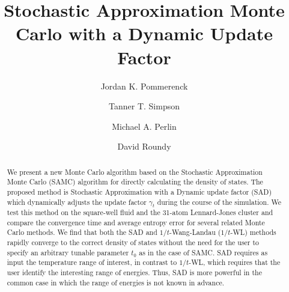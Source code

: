 \documentclass[letterpaper,twocolumn,amsmath,amssymb,pre,aps,10pt]{revtex4-1}
\begin{document}
\title{Stochastic Approximation Monte Carlo with a Dynamic Update
Factor
}

\author{Jordan K. Pommerenck} \author{Tanner T. Simpson}
\author{Michael A. Perlin} \author{David Roundy}

\begin{abstract}
  We present a new Monte Carlo algorithm based on the Stochastic
  Approximation Monte Carlo (SAMC) algorithm for directly calculating
  the density of states. The proposed method is Stochastic
  Approximation with a Dynamic update factor (SAD)
  which dynamically adjusts the update factor $\gamma_t$ during the course of
  the simulation. We test this method on the square-well fluid and
  the 31-atom Lennard-Jones cluster and
  compare the convergence time and average entropy error for several
  related
  Monte Carlo methods. We find that both the SAD and $1/t$-Wang-Landau ($1/t$-WL)
  methods rapidly converge to the
  correct density of states without the need for the user to specify an
  arbitrary tunable parameter $t_0$ as in the case of SAMC.  SAD requires
  as input the temperature range of interest, in contrast to
  $1/t$-WL, which requires that the user identify the interesting range
  of energies.  Thus, SAD is more powerful in the common case in which the range
  of energies is not known in advance.
\end{abstract}

\maketitle
\end{document}
